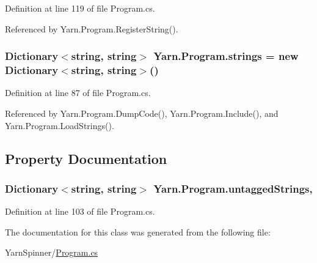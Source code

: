 Definition at line 119 of file Program.\-cs.



Referenced by Yarn.\-Program.\-Register\-String().

\hypertarget{a00154_a59263e00cecfe36d9881b4c30b048f09}{
\subsubsection[{strings}]{\setlength{\rightskip}{0pt plus 5cm}Dictionary$<$string, string$>$ Yarn.\-Program.\-strings = new Dictionary$<$string, string$>$()\hspace{0.3cm}{\ttfamily [package]}}}\label{a00154_a59263e00cecfe36d9881b4c30b048f09}


Definition at line 87 of file Program.\-cs.



Referenced by Yarn.\-Program.\-Dump\-Code(), Yarn.\-Program.\-Include(), and Yarn.\-Program.\-Load\-Strings().



\subsection{Property Documentation}
\hypertarget{a00154_aa8fedbfceaf931d1da3f600eaab6ae87}{
\subsubsection[{untagged\-Strings}]{\setlength{\rightskip}{0pt plus 5cm}Dictionary$<$string, string$>$ Yarn.\-Program.\-untagged\-Strings\hspace{0.3cm}{\ttfamily [get]}, {\ttfamily [package]}}}\label{a00154_aa8fedbfceaf931d1da3f600eaab6ae87}


Definition at line 103 of file Program.\-cs.



The documentation for this class was generated from the following file\-:\begin{DoxyCompactItemize}
\item 
Yarn\-Spinner/\hyperlink{a00317}{Program.\-cs}\end{DoxyCompactItemize}

